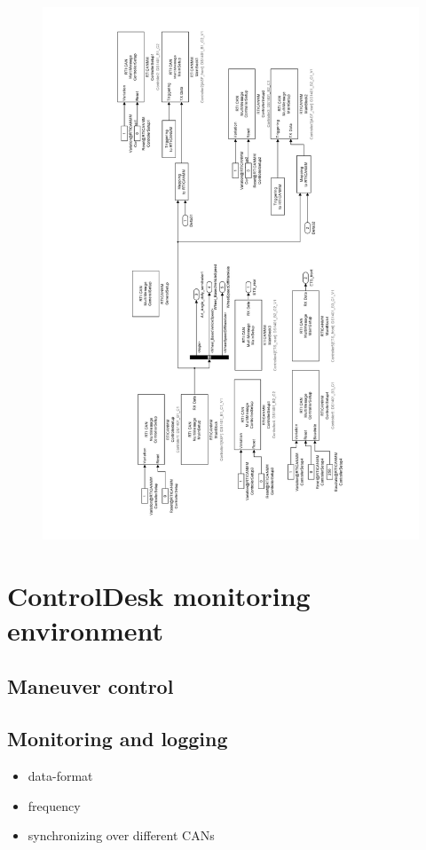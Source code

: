 \documentclass[ExampleMasters.tex]{subfiles}
\begin{document}
 \begin{figure}
\centering
\includegraphics[width=1\linewidth]{figures/steering_interface_inside_pdf}
\caption{}
\label{fig:steering_interface_inside_pdf}
\end{figure}

 
\section{ControlDesk monitoring environment}
\label{sec:control_desk}
\subsection{Maneuver control}


\subsection{Monitoring and logging}
\begin{itemize}
	\item data-format
	\item frequency
	\item synchronizing over different CANs	
\end{itemize}
\end{document}
